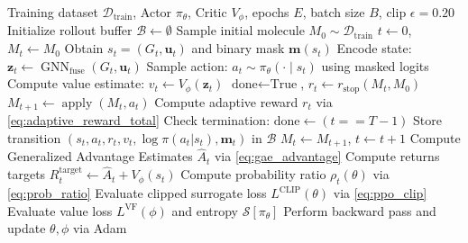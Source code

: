 \documentclass{ieeeaccess}
\begin{document}
\vspace{6pt}

\noindent\begin{minipage}{\columnwidth}
\begin{algorithm}[H]
\caption{Edge-Aware Policy Rollout and PPO Training Loop}
\label{alg:ppo_training}
\footnotesize
\begin{algorithmic}[1]
\REQUIRE Training dataset $\mathcal{D}_{\text{train}}$, Actor $\pi_\theta$, Critic $V_\phi$, epochs $E$, batch size $B$, clip $\epsilon = 0.20$
    \STATE Initialize rollout buffer $\mathcal{B} \leftarrow \emptyset$
        \STATE Sample initial molecule $M_0 \sim \mathcal{D}_{\text{train}}$
        \STATE $t \leftarrow 0$, $M_t \leftarrow M_0$
            \STATE Obtain $s_t = (G_t, \mathbf{u}_t)$ and binary mask $\mathbf{m}(s_t)$
            \STATE Encode state: $\mathbf{z}_t \leftarrow \operatorname{GNN}_{\text{fuse}}(G_t, \mathbf{u}_t)$
            \STATE Sample action: $a_t \sim \pi_\theta(\cdot \mid s_t)$ using masked logits
            \STATE Compute value estimate: $v_t \leftarrow V_\phi(\mathbf{z}_t)$
                \STATE $\text{done} \leftarrow \text{True}$, $r_t \leftarrow r_{\text{stop}}(M_t, M_0)$
            \ELSE
                \STATE $M_{t+1} \leftarrow \operatorname{apply}(M_t, a_t)$
                \STATE Compute adaptive reward $r_t$ via \eqref{eq:adaptive_reward_total}
                \STATE Check termination: $\text{done} \leftarrow (t == T-1)$
            \ENDIF
            \STATE Store transition $(s_t, a_t, r_t, v_t, \log \pi(a_t|s_t), \mathbf{m}_t)$ in $\mathcal{B}$
            \STATE $M_t \leftarrow M_{t+1}$, $t \leftarrow t + 1$
        \ENDWHILE
    \ENDFOR
    \STATE Compute Generalized Advantage Estimates $\hat{A}_t$ via \eqref{eq:gae_advantage}
    \STATE Compute returns targets $R_t^{\text{target}} \leftarrow \hat{A}_t + V_\phi(s_t)$
            \STATE Compute probability ratio $\rho_t(\theta)$ via \eqref{eq:prob_ratio}
            \STATE Evaluate clipped surrogate loss $L^{\text{CLIP}}(\theta)$ via \eqref{eq:ppo_clip}
            \STATE Evaluate value loss $L^{\text{VF}}(\phi)$ and entropy $\mathcal{S}[\pi_\theta]$
            \STATE Perform backward pass and update $\theta, \phi$ via Adam
        \ENDFOR
    \ENDFOR
\ENDFOR
\end{algorithmic}
\end{algorithm}
\end{minipage}
\end{document}
